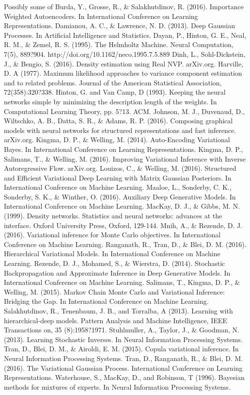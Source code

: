 \documentclass{article}
\begin{document}
Possibly some of 
Burda, Y., Grosse, R., \& Salakhutdinov, R. (2016). Importance Weighted Autoencoders. In International Conference on Learning Representations.
Damianou, A. C., \& Lawrence, N. D. (2013). Deep Gaussian Processes. In Artificial Intelligence and Statistics.
Dayan, P., Hinton, G. E., Neal, R. M., \& Zemel, R. S. (1995). The Helmholtz Machine. Neural Computation, 7(5), 889?904. http://doi.org/10.1162/neco.1995.7.5.889
Dinh, L., Sohl-Dickstein, J., \& Bengio, S. (2016). Density estimation using Real NVP. arXiv.org.
Harville, D. A (1977). Maximum likelihood approaches to variance component estimation and to related problems. Journal of the American Statistical Association, 72(358):320?338.
Hinton, G. and Van Camp, D (1993). Keeping the neural networks simple by minimizing the description length of the weights. In Computational Learning Theory, pp. 5?13. ACM.
Johnson, M. J., Duvenaud, D., Wiltschko, A. B., Datta, S. R., \& Adams, R. P. (2016). Composing graphical models with neural networks for structured representations and fast inference. arXiv.org.
Kingma, D. P., \& Welling, M. (2014). Auto-Encoding Variational Bayes. In International Conference on Learning Representations.
Kingma, D. P., Salimans, T., \& Welling, M. (2016). Improving Variational Inference with Inverse Autoregressive Flow. arXiv.org.
Louizos, C., \& Welling, M. (2016). Structured and Efficient Variational Deep Learning with Matrix Gaussian Posteriors. In International Conference on Machine Learning.
Maaloe, L., Sonderby, C. K., Sonderby, S. K., \& Winther, O. (2016). Auxiliary Deep Generative Models. In International Conference on Machine Learning.
MacKay, D. J., \& Gibbs, M. N. (1999). Density networks. Statistics and neural networks: advances at the interface. Oxford University Press, Oxford, 129-144.
Mnih, A., \& Rezende, D. J. (2016). Variational inference for Monte Carlo objectives. In International Conference on Machine Learning.
Ranganath, R., Tran, D., \& Blei, D. M. (2016). Hierarchical Variational Models. In International Conference on Machine Learning.
Rezende, D. J., Mohamed, S., \& Wierstra, D. (2014). Stochastic Backpropagation and Approximate Inference in Deep Generative Models. In International Conference on Machine Learning.
Salimans, T., Kingma, D. P., \& Welling, M. (2015). Markov Chain Monte Carlo and Variational Inference: Bridging the Gap. In International Conference on Machine Learning.
Salakhutdinov, R., Tenenbaum, J. B., and Torralba, A (2013). Learning with hierarchical-deep models. Pattern Analysis and Machine Intelligence, IEEE Transactions on, 35 (8):1958?1971.
Stuhlmuller, A., Taylor, J., \& Goodman, N. (2013). Learning Stochastic Inverses. In Neural Information Processing Systems.
Tran, D., Blei, D. M., \& Airoldi, E. M. (2015). Copula variational inference. In Neural Information Processing Systems.
Tran, D., Ranganath, R., \& Blei, D. M. (2016). The Variational Gaussian Process. International Conference on Learning Representations.
Waterhouse, S., MacKay, D., and Robinson, T (1996). Bayesian methods for mixtures of experts. In Neural Information Processing Systems.
\end{document}
